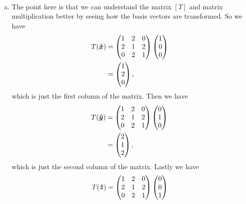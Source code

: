 \documentclass[12pt]{article} %
\begin{document}
\begin{solution}~
\begin{enumerate}[(a)]
    \item The point here is that we can understand the matrix $[T]$ and matrix multiplication better by seeing how the basis vectors are transformed. So we have
    \begin{align*}
        T(\boldsymbol{\hat{x}}) &= \begin{pmatrix}
1& 2& 0\\
2& 1& 2\\
0& 2& 1
\end{pmatrix} \begin{pmatrix} 1 \\ 0 \\ 0 \end{pmatrix}\\
&= \begin{pmatrix} 1 \\ 2 \\ 0 \end{pmatrix},
    \end{align*}
    which is just the first column of the matrix. Then we have
    \begin{align*}
                T(\boldsymbol{\hat{y}}) &= \begin{pmatrix}
1& 2& 0\\
2& 1& 2\\
0& 2& 1
\end{pmatrix} \begin{pmatrix} 0 \\ 1 \\ 0 \end{pmatrix}\\
&= \begin{pmatrix} 2 \\ 1 \\ 2 \end{pmatrix},
    \end{align*}
    which is just the second column of the matrix. Lastly we have
    \begin{align*}
                T(\zhat) &= \begin{pmatrix}
1& 2& 0\\
2& 1& 2\\
0& 2& 1
\end{pmatrix} \begin{pmatrix} 0 \\ 0 \\ 1 \end{pmatrix}\\

\end{align*}
\end{enumerate}
\end{solution}
\end{document}
